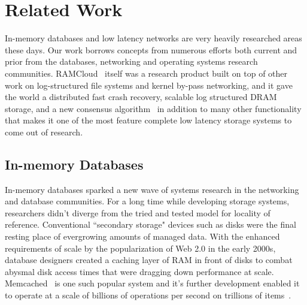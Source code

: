 
\chapter{Related Work}
\label{chap:relatedwork}

In-memory databases and low latency networks are very heavily researched areas
these days. Our work borrows concepts from numerous efforts both current and 
prior from the databases, networking and operating systems research communities.
RAMCloud~\cite{ramcloud} itself was a research product built on top of other 
work on log-structured file systems and kernel by-pass networking, and it gave the 
world a distributed fast crash recovery, scalable log structured DRAM storage, and a new consensus 
algorithm~\cite{ryan-thesis,ongaro2011fast,ramcloudfast,raft} in addition to many other 
functionality that makes it one of the most feature complete low latency storage systems 
to come out of research.

\section{In-memory Databases}
In-memory databases sparked a new wave of systems research in the 
networking and database communities. For a long time while developing storage
systems, researchers didn't diverge from the  tried and tested model for
locality of reference. Conventional ``secondary storage" devices
such as disks were the final resting place of evergrowing amounts of managed data. With the 
enhanced requirements of scale by the popularization of Web 2.0 in the early 2000s, 
database designers created a caching layer of RAM in front of disks
to combat abysmal disk access times that were dragging down performance at scale. Memcached~\cite{memcached-orig}
is one such popular system and it's further development
enabled it to operate at a scale of billions of operations per second on trillions of items~\cite{nishtala2013scaling}.

